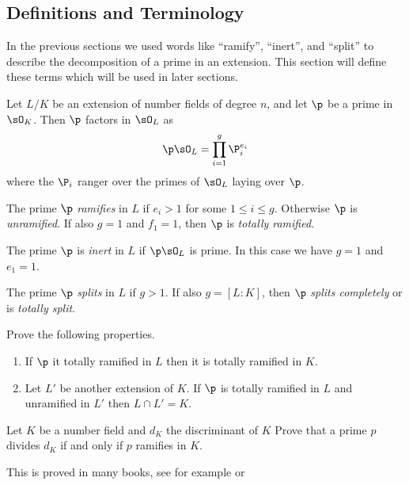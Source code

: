 \subsection{Definitions and Terminology}

In the previous sections we used words like ``ramify'',
``inert'', and ``split'' to describe the decomposition
of a prime in an extension. This section will define these
terms which will be used in later sections.

Let $L/K$ be an extension of number fields of degree $n$,
and let $\p$ be a prime in $\sO_K$. Then $\p$ factors in $\sO_L$ as
\[
  \p\sO_L = \prod_{i=1}^g \P_i^{e_i}
\]
where the $\P_i$ ranger over the primes of $\sO_L$ laying over $\p$.

\begin{definition}\label{def:ramify}
  The prime $\p$ \emph{ramifies} in $L$ if $e_i > 1$ for some $1\leq i\leq g$.
  Otherwise $\p$ is \emph{unramified}.
  If also $g = 1$ and $f_1 = 1$, then $\p$ is \emph{totally ramified}.
\end{definition}

\begin{definition}\label{def:inert}
  The prime $\p$ is \emph{inert} in $L$ if $\p\sO_L$ is prime.
  In this case we have $g = 1$ and $e_1 = 1$.
\end{definition}

\begin{definition}\label{def:split}
  The prime $\p$ \emph{splits} in $L$ if $g > 1$. If also $g = [L : K]$,
  then $\p$ \emph{splits completely} or is \emph{totally split}.
\end{definition}

\begin{exercise}
  Prove the following properties.
  \begin{enumerate}[label=(\alph*)]
    \item If $\p$ it totally ramified in $L$
          then it is totally ramified in $K$.

    \item Let $L'$ be another extension of $K$.
          If $\p$ is totally ramified in $L$ and unramified in $L'$
          then $L\cap L' = K$.
  \end{enumerate}
\end{exercise}

\begin{exercise}
  Let $K$ be a number field and $d_K$ the discriminant of $K$
  Prove that a prime $p$ divides $d_K$ if and only if $p$ ramifies in $K$.

  \begin{hint}
    This is proved in many books, see for example
    \cite[Thm.~24]{marcus1977number} or \cite[Cor.~III.2.12]{neukirch1999}
  \end{hint}
\end{exercise}

